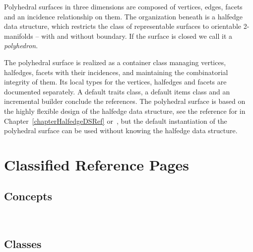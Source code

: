 



Polyhedral surfaces in three dimensions are composed of vertices,
edges, facets and an incidence relationship on them. The organization
beneath is a halfedge data structure, which restricts the class of
representable surfaces to orientable 2-manifolds -- with and without
boundary. If the surface is closed we call it a {\em polyhedron}.

The polyhedral surface is realized as a container class managing
vertices, halfedges, facets with their incidences, and maintaining the
combinatorial integrity of them. Its local types for the vertices,
halfedges and facets are documented separately.  A default traits
class, a default items class and an incremental builder conclude the
references. The polyhedral surface is based on the highly flexible
design of the halfedge data structure, see the reference for
 in Chapter~\ref{chapterHalfedgeDSRef}
or~\cite{k-ugpdd-99}, but the default instantiation of the polyhedral
surface can be used without knowing the halfedge data structure.

\section{Classified Reference Pages}

\subsection*{Concepts}

\\ 

\subsection*{Classes}

